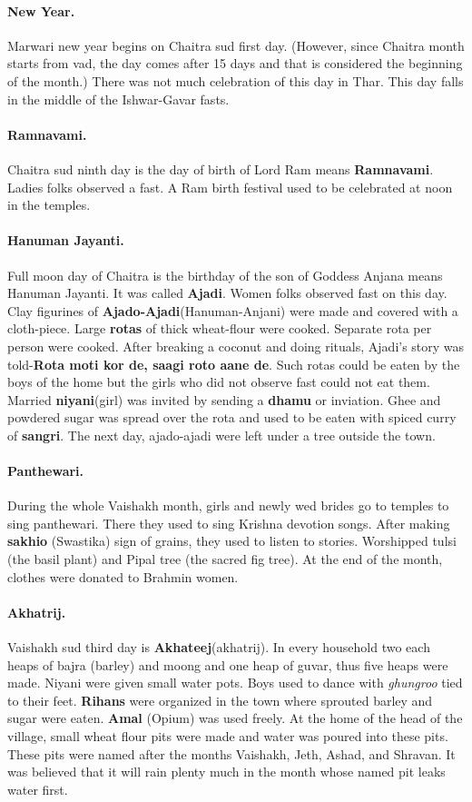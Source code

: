 \paragraph{New Year.} Marwari new year begins on Chaitra sud first day.
(However, since Chaitra month starts from vad, the day comes after 15 days and
that is considered the beginning of the month.) There was not much celebration
of  this day in Thar. This day falls in the middle of the Ishwar-Gavar fasts.
\paragraph{Ramnavami.} Chaitra sud ninth day is the day of birth of Lord Ram
means \textbf{Ramnavami}. Ladies folks observed a fast. A Ram birth festival
used to be celebrated at noon in the temples.
\paragraph{Hanuman Jayanti.} Full moon day of Chaitra is the birthday of the son
of Goddess Anjana means Hanuman Jayanti. It was called \textbf{Ajadi}. Women
folks observed fast on this day. Clay figurines of
\textbf{Ajado-Ajadi}(Hanuman-Anjani) were made and covered with a cloth-piece. Large \textbf{rotas} of thick wheat-flour were
cooked. Separate rota per person were cooked. After breaking a coconut and
doing rituals, Ajadi's story was told-\textbf{Rota moti kor de, saagi roto aane
de}. Such rotas could be eaten by the boys of the home but the girls who did not
observe fast could not eat them. Married \textbf{niyani}(girl) was invited by
sending a \textbf{dhamu} or inviation. Ghee and powdered sugar was spread over
the rota and used to be eaten with spiced curry of \textbf{sangri}. The next
day, ajado-ajadi were left under a tree outside the town.
\paragraph{Panthewari.} During the whole Vaishakh month, girls and newly wed brides go to
temples to sing panthewari. There they used to sing Krishna devotion songs.
After making \textbf{sakhio} (Swastika) sign of grains, they used to listen to
stories. Worshipped tulsi (the basil plant) and Pipal tree (the sacred fig
tree). At the end of the month, clothes were donated to Brahmin women.
\paragraph{Akhatrij.} Vaishakh sud third day is \textbf{Akhateej}(akhatrij). In
every household two each heaps of bajra (barley) and moong and one heap of guvar, thus five
heaps were made. Niyani were given small water pots. Boys used to dance with
\textit{ghungroo} tied to their feet. \textbf{Rihans} were organized in the town
where sprouted barley and sugar were eaten. \textbf{Amal} (Opium) was used
freely. At the home of the head of the village, small wheat flour pits were made and
water was poured into these pits. These pits were named after the months
Vaishakh, Jeth, Ashad, and Shravan. It was believed that it will rain plenty
much in the month whose named pit leaks water first.
